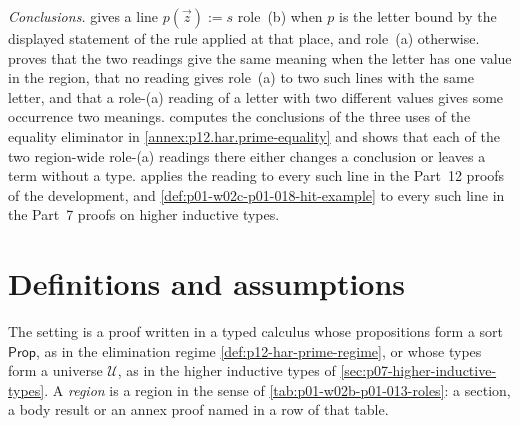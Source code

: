 \emph{Conclusions.}   gives a
line \(p(\vec z):=s\) role~(b) when \(p\) is the letter bound by the
displayed statement of the rule applied at that place, and role~(a)
otherwise.   proves that the
two readings give the same meaning when the letter has one value in the
region, that no reading gives role~(a) to two such lines with the same
letter, and that a role-(a) reading of a letter with two different values
gives some occurrence two meanings.
 computes the conclusions of
the three uses of the equality eliminator in
\cref{annex:p12.har.prime-equality} and shows that each of the two
region-wide role-(a) readings there either changes a conclusion or leaves
a term without a type.   applies the
reading to every such line in the Part~12 proofs of the development, and
\cref{def:p01-w02c-p01-018-hit-example} to every such line in the Part~7
proofs on higher inductive types.

\section{Definitions and assumptions}
\label{sec:p01-w02c-p01-018-definitions}

The setting is a proof written in a typed calculus whose propositions form
a sort \(\mathsf{Prop}\), as in the elimination regime
\cref{def:p12-har-prime-regime}, or whose types form a universe
\(\mathcal U\), as in the higher inductive types of
\cref{sec:p07-higher-inductive-types}.  A \emph{region} is a region in the sense
of \cref{tab:p01-w02b-p01-013-roles}: a section, a body result or an annex
proof named in a row of that table.

